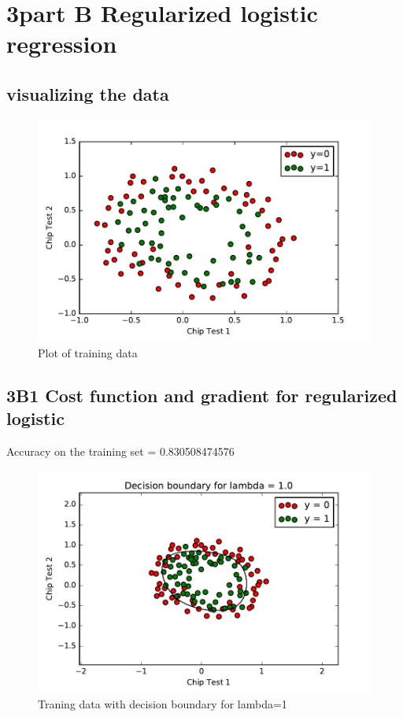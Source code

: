\documentclass[pdftex,11pt]{article}
\begin{document}
\section{3part B Regularized logistic regression}
\subsection{visualizing the data}

\begin{figure}[H]
  \caption{Plot of training data}
  \centering
    \includegraphics[scale=0.5]{fig3.pdf}
\end{figure}
\subsection{3B1 Cost function and gradient for regularized logistic }

Accuracy on the training set =  0.830508474576
\begin{figure}[H]
  \caption{Traning data with decision boundary for lambda=1}
  \centering
    \includegraphics[scale=0.5]{fig4.pdf}
\end{figure}
\end{document}
